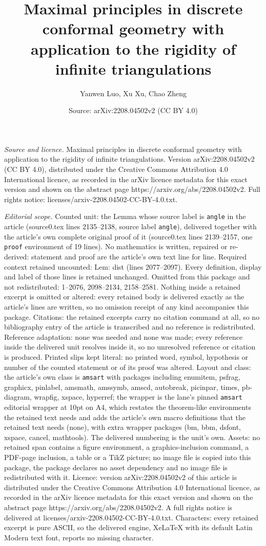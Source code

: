 \documentclass[10pt,a4paper]{amsart}
\title[Maximal principles in discrete conformal geometry with appli]{Maximal principles in discrete conformal geometry with application to the rigidity of infinite triangulations}
\author{Yanwen Luo, Xu Xu, Chao Zheng}
\date{Source: arXiv:2208.04502v2 (CC BY 4.0)}
\begin{document}
\maketitle

\noindent\emph{Source and licence.} Maximal principles in discrete conformal geometry with application to the rigidity of infinite triangulations. Version arXiv:2208.04502v2 (CC BY 4.0), distributed under the Creative Commons Attribution 4.0 International licence, as recorded in the arXiv licence metadata for this exact version and shown on the abstract page https://arxiv.org/abs/2208.04502v2. Full rights notice: licenses/arxiv-2208.04502-CC-BY-4.0.txt.\par\smallskip

\noindent\textit{Editorial scope.} Counted unit: the Lemma whose source label is \texttt{angle} in the article (source0.tex lines 2135--2138, source label \texttt{angle}), delivered together with the article's own complete original proof of it (source0.tex lines 2139--2157, one \texttt{proof} environment of 19 lines). No mathematics is written, repaired or re-derived: statement and proof are the article's own text line for line. Required context retained uncounted: Lem: dist (lines 2077--2097). Every definition, display and label of those lines is retained unchanged. Omitted from this package and not redistributed: 1--2076, 2098--2134, 2158--2581. Nothing inside a retained excerpt is omitted or altered: every retained body is delivered exactly as the article's lines are written, so no omission receipt of any kind accompanies this package. Citations: the retained excerpts carry no citation command at all, so no bibliography entry of the article is transcribed and no reference is redistributed. Reference adaptation: none was needed and none was made; every reference inside the delivered unit resolves inside it, so no unresolved reference or citation is produced. Printed slips kept literal: no printed word, symbol, hypothesis or number of the counted statement or of its proof was altered. Layout and class: the article's own class is \texttt{amsart} with packages including enumitem, psfrag, graphicx, pinlabel, amsmath, amssymb, amscd, autobreak, picinpar, times, pb-diagram, wrapfig, xspace, hyperref; the wrapper is the lane's pinned \texttt{amsart} editorial wrapper at 10pt on A4, which restates the theorem-like environments the retained text needs and adds the article's own macro definitions that the retained text needs (none), with extra wrapper packages (bm, bbm, dsfont, xspace, cancel, mathtools). The delivered numbering is the unit's own. Assets: no retained span contains a figure environment, a graphics-inclusion command, a PDF-page inclusion, a table or a TikZ picture; no image file is copied into this package, the package declares no asset dependency and no image file is redistributed with it. Licence: version arXiv:2208.04502v2 of this article is distributed under the Creative Commons Attribution 4.0 International licence, as recorded in the arXiv licence metadata for this exact version and shown on the abstract page https://arxiv.org/abs/2208.04502v2. A full rights notice is delivered at licenses/arxiv-2208.04502-CC-BY-4.0.txt. Characters: every retained excerpt is pure ASCII, so the delivered engine, XeLaTeX with its default Latin Modern text font, reports no missing character.
\end{document}
